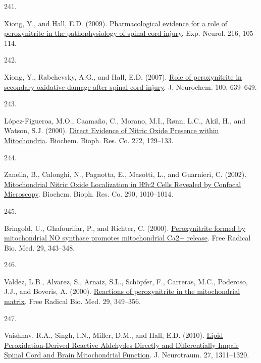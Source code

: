 \documentclass[
]{article}
\newlength{\cslhangindent}
\newlength{\csllabelwidth}
\newlength{\cslentryspacingunit} %
\newenvironment{CSLReferences}[2] %
 {%
  \setlength{\parindent}{0pt}
  \ifodd #1
  \let\oldpar\par
  \def\par{\hangindent=\cslhangindent\oldpar}
  \fi
  \setlength{\parskip}{#2\cslentryspacingunit}
 }%
 {}
\newcommand{\CSLLeftMargin}[1]{\parbox[t]{\csllabelwidth}{#1}}
\newcommand{\CSLRightInline}[1]{\parbox[t]{\linewidth - \csllabelwidth}{#1}\break}
\begin{document}
\begin{CSLReferences}{0}{0}
\leavevmode{}%
\CSLLeftMargin{241. }
\CSLRightInline{Xiong, Y., and Hall, E.D. (2009). \href{https://doi.org/10.1016/j.expneurol.2008.11.025}{Pharmacological evidence for a role of peroxynitrite in the pathophysiology of spinal cord injury}. Exp. Neurol. 216, 105--114.}

\leavevmode{}%
\CSLLeftMargin{242. }
\CSLRightInline{Xiong, Y., Rabchevsky, A.G., and Hall, E.D. (2007). \href{https://doi.org/10.1111/j.1471-4159.2006.04312.x}{Role of peroxynitrite in secondary oxidative damage after spinal cord injury}. J. Neurochem. 100, 639--649.}

\leavevmode{}%
\CSLLeftMargin{243. }
\CSLRightInline{López-Figueroa, M.O., Caamaño, C., Morano, M.I., Rønn, L.C., Akil, H., and Watson, S.J. (2000). \href{https://doi.org/10.1006/bbrc.2000.2748}{Direct {Evidence} of {Nitric Oxide Presence} within {Mitochondria}}. Biochem. Bioph. Res. Co. 272, 129--133.}

\leavevmode{}%
\CSLLeftMargin{244. }
\CSLRightInline{Zanella, B., Calonghi, N., Pagnotta, E., Masotti, L., and Guarnieri, C. (2002). \href{https://doi.org/10.1006/bbrc.2001.6284}{Mitochondrial {Nitric Oxide Localization} in {H9c2 Cells Revealed} by {Confocal Microscopy}}. Biochem. Bioph. Res. Co. 290, 1010--1014.}

\leavevmode{}%
\CSLLeftMargin{245. }
\CSLRightInline{Bringold, U., Ghafourifar, P., and Richter, C. (2000). \href{https://doi.org/10.1016/S0891-5849(00)00318-X}{Peroxynitrite formed by mitochondrial {NO} synthase promotes mitochondrial {Ca2}+ release}. Free Radical Bio. Med. 29, 343--348.}

\leavevmode{}%
\CSLLeftMargin{246. }
\CSLRightInline{Valdez, L.B., Alvarez, S., Arnaiz, S.L., Schöpfer, F., Carreras, M.C., Poderoso, J.J., and Boveris, A. (2000). \href{https://doi.org/10.1016/S0891-5849(00)00301-4}{Reactions of peroxynitrite in the mitochondrial matrix}. Free Radical Bio. Med. 29, 349--356.}

\leavevmode{}%
\CSLLeftMargin{247. }
\CSLRightInline{Vaishnav, R.A., Singh, I.N., Miller, D.M., and Hall, E.D. (2010). \href{https://doi.org/10.1089/neu.2009.1172}{Lipid {Peroxidation-Derived Reactive Aldehydes Directly} and {Differentially Impair Spinal Cord} and {Brain Mitochondrial Function}}. J. Neurotraum. 27, 1311--1320.}


\end{CSLReferences}
\end{document}
